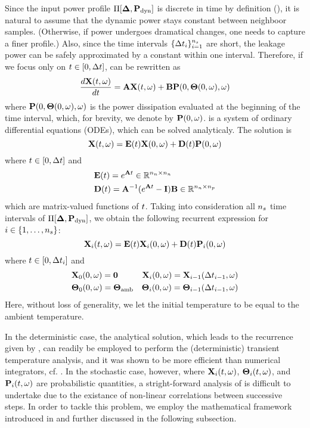 Since the input power profile $\prof{\mP_\dyn}$ is discrete in time by definition (), it is natural to assume that the dynamic power stays constant between neighboor samples. (Otherwise, if power undergoes dramatical changes, one needs to capture a finer profile.) Also, since the time intervals $\{ \Delta t_i \}_{i = 1}^{{n_s}}$ are short, the leakage power can be safely approximated by a constant within one interval. Therefore, if we focus only on $t \in [0, \Delta t]$,  can be rewritten as
\begin{equation} \elabel{fourier-ode}
  \frac{d\vX(\t, \o)}{d\t} = \mA \vX(\t, \o) + \mB \vP(0, \vTO(0, \o), \o)
\end{equation}
where $\mathbf{P}(0, {\boldsymbol\Theta}(0, \omega), \omega)$ is the power dissipation evaluated at the beginning of the time interval, which, for brevity, we denote by $\mathbf{P}(0, \omega)$.  is a system of ordinary differential equations (ODEs), which can be solved analyticaly. The solution is
\begin{equation} \elabel{ode-solution}
  \vX(\t, \o) = \mE(\t) \vX(0, \o) + \mD(\t) \vP(0, \o)
\end{equation}
where $t \in [0, \Delta t]$ and
\begin{align}
  & \mE(\t) = e^{\mA \t} \in \real^{\nodes \times \nodes} \elabel{e} \\
  & \mD(\t) = \mA^{-1} (e^{\mA \t} - \mI) \mB \in \real^{\nodes \times \cores} \elabel{d}
\end{align}
which are matrix-valued functions of $t$. Taking into consideration all ${n_s}$ time intervals of $\prof{\mP_\dyn}$, we obtain the following recurrent expression for $i \in \{ 1, \dotsc, {n_s} \}$:
\begin{equation} \elabel{recurrence}
  \vX_i(\t, \o) = \mE(\t) \vX_i(0, \o) + \mD(\t) \vP_i(0, \o)
\end{equation}
where $t \in [ 0, \Delta t_i ]$ and
\begin{align*}
  & \vX_0(0, \o) = \mZ & \vX_i(0, \o) = \vX_{i - 1}(\dt_{i - 1}, \o) \\
  & \vTO_0(0, \o) = \vTO_\amb & \vTO_i(0, \o) = \vTO_{i - 1}(\dt_{i - 1}, \o)
\end{align*}
Here, without loss of generality, we let the initial temperature to be equal to the ambient temperature.

In the deterministic case, the analytical solution, which leads to the recurrence given by , can readily be employed to perform the (deterministic) transient temperature analysis, and it was shown to be more efficient than numerical integrators, cf. \cite{ukhov2012}. In the stochastic case, however, where $\mathbf{X}_i(t, \omega)$, ${\boldsymbol\Theta}_i(t, \omega)$, and $\mathbf{P}_i(t, \omega)$ are probabilistic quantities, a stright-forward analysis of  is difficult to undertake due to the existance of non-linear correlations between successive steps. In order to tackle this problem, we employ the mathematical framework introduced in  and further discussed in the following subsection.
